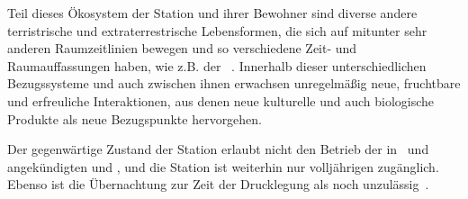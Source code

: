 \begin{newstuff}
    Teil dieses Ökosystem der Station und ihrer Bewohner sind diverse andere terristrische und extraterrestrische Lebensformen, die sich auf mitunter sehr anderen Raumzeitlinien bewegen und so verschiedene Zeit- und Raumauffassungen haben, wie z.B. der ~\cite{symbiont}. Innerhalb dieser unterschiedlichen Bezugssysteme und auch zwischen ihnen erwachsen unregelmäßig neue, fruchtbare und erfreuliche Interaktionen, aus denen neue kulturelle und auch biologische Produkte als neue Bezugspunkte hervorgehen. 

    Der gegenwärtige Zustand der Station erlaubt nicht den Betrieb der in~\cite{ctour} und~\cite{cbasestarbasemanual} angekündigten  und , und die Station ist weiterhin nur volljährigen zugänglich. Ebenso ist die Übernachtung zur Zeit der Drucklegung als  noch unzulässig~\cite[S. 58]{cbasebook}.
\end{newstuff}